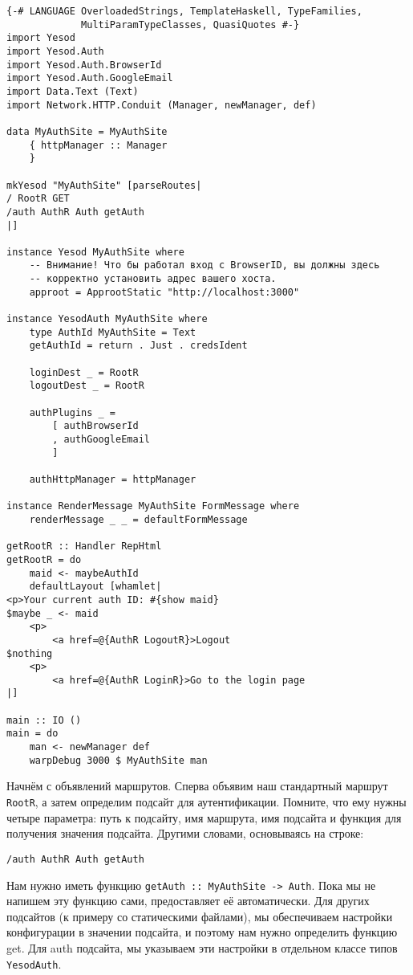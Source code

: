 \begin{lstlisting}
{-# LANGUAGE OverloadedStrings, TemplateHaskell, TypeFamilies,
             MultiParamTypeClasses, QuasiQuotes #-}
import Yesod
import Yesod.Auth
import Yesod.Auth.BrowserId
import Yesod.Auth.GoogleEmail
import Data.Text (Text)
import Network.HTTP.Conduit (Manager, newManager, def)

data MyAuthSite = MyAuthSite
    { httpManager :: Manager
    }

mkYesod "MyAuthSite" [parseRoutes|
/ RootR GET
/auth AuthR Auth getAuth
|]

instance Yesod MyAuthSite where
    -- Внимание! Что бы работал вход с BrowserID, вы должны здесь
    -- корректно установить адрес вашего хоста.
    approot = ApprootStatic "http://localhost:3000"

instance YesodAuth MyAuthSite where
    type AuthId MyAuthSite = Text
    getAuthId = return . Just . credsIdent

    loginDest _ = RootR
    logoutDest _ = RootR

    authPlugins _ =
        [ authBrowserId
        , authGoogleEmail
        ]

    authHttpManager = httpManager

instance RenderMessage MyAuthSite FormMessage where
    renderMessage _ _ = defaultFormMessage

getRootR :: Handler RepHtml
getRootR = do
    maid <- maybeAuthId
    defaultLayout [whamlet|
<p>Your current auth ID: #{show maid}
$maybe _ <- maid
    <p>
        <a href=@{AuthR LogoutR}>Logout
$nothing
    <p>
        <a href=@{AuthR LoginR}>Go to the login page
|]

main :: IO ()
main = do
    man <- newManager def
    warpDebug 3000 $ MyAuthSite man
\end{lstlisting}%

Начнём с объявлений маршрутов. Сперва объявим наш стандартный маршрут \lstinline'RootR', а затем определим подсайт для аутентификации. Помните, что ему нужны четыре параметра: путь к подсайту, имя маршрута, имя подсайта и функция для получения значения подсайта. Другими словами, основываясь на строке:

\begin{lstlisting}
/auth AuthR Auth getAuth
\end{lstlisting}

Нам нужно иметь функцию \lstinline'getAuth :: MyAuthSite -> Auth'. Пока мы не напишем эту функцию сами,  предоставляет её автоматически. Для других подсайтов (к примеру со статическими файлами), мы обеспечиваем настройки конфигурации в значении подсайта, и поэтому нам нужно определить функцию get. Для auth подсайта, мы указываем эти настройки в отдельном классе типов \lstinline'YesodAuth'.

